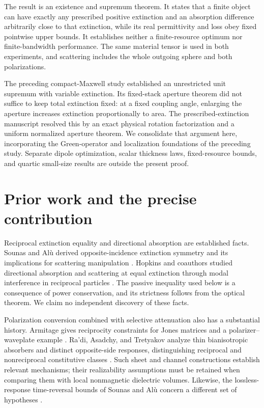\documentclass[11pt]{article}
\begin{document}
The result is an existence and supremum theorem. It states that a finite object can have exactly any prescribed positive extinction and an absorption difference arbitrarily close to that extinction, while its real permittivity and loss obey fixed pointwise upper bounds. It establishes neither a finite-resource optimum nor finite-bandwidth performance. The same material tensor is used in both experiments, and scattering includes the whole outgoing sphere and both polarizations.

The preceding compact-Maxwell study established an unrestricted unit supremum with variable extinction. Its fixed-stack aperture theorem did not suffice to keep total extinction fixed: at a fixed coupling angle, enlarging the aperture increases extinction proportionally to area. The prescribed-extinction manuscript resolved this by an exact physical rotation factorization and a uniform normalized aperture theorem. We consolidate that argument here, incorporating the Green-operator and localization foundations of the preceding study. Separate dipole optimization, scalar thickness laws, fixed-resource bounds, and quartic small-size results are outside the present proof.

\section{Prior work and the precise contribution}\label{sec:prior}
Reciprocal extinction equality and directional absorption are established facts. Sounas and Al\`u derived opposite-incidence extinction symmetry and its implications for scattering manipulation \citep{SounasAlu2014}. Hopkins and coauthors studied directional absorption and scattering at equal extinction through modal interference in reciprocal particles \citep{Hopkins2015}. The passive inequality used below is a consequence of power conservation, and its strictness follows from the optical theorem. We claim no independent discovery of these facts.

Polarization conversion combined with selective attenuation also has a substantial history. Armitage gives reciprocity constraints for Jones matrices and a polarizer--waveplate example \citep{Armitage2014}. Ra'di, Asadchy, and Tretyakov analyze thin bianisotropic absorbers and distinct opposite-side responses, distinguishing reciprocal and nonreciprocal constitutive classes \citep{Radi2013}. Such sheet and channel constructions establish relevant mechanisms; their realizability assumptions must be retained when comparing them with local nonmagnetic dielectric volumes. Likewise, the lossless-response time-reversal bounds of Sounas and Al\`u concern a different set of hypotheses \citep{SounasAlu2017}.
\end{document}
